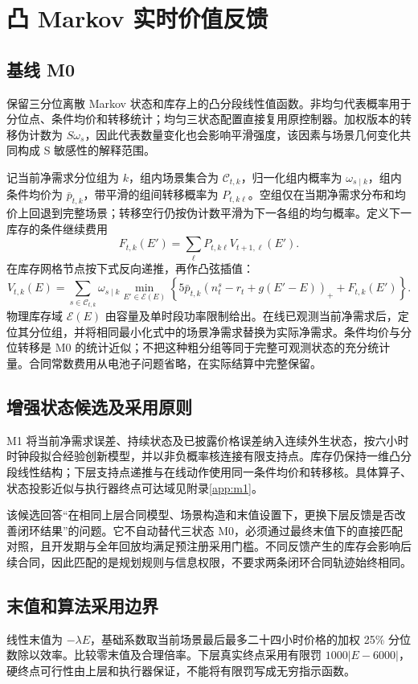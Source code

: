 \documentclass[UTF8,a4paper,zihao=-4,fontset=mac]{ctexart}
\newcommand{\pos}[1]{\left(#1\right)_+}
\begin{document}
\section{凸 Markov 实时价值反馈}
\subsection{基线 M0}
保留三分位离散 Markov 状态和库存上的凸分段线性值函数。非均匀代表概率用于分位点、条件均价和转移统计；均匀三状态配置直接复用原控制器。加权版本的转移伪计数为 \(S\omega_s\)，因此代表数量变化也会影响平滑强度，该因素与场景几何变化共同构成 S 敏感性的解释范围。

记当前净需求分位组为 \(k\)，组内场景集合为 \(\mathcal C_{t,k}\)，归一化组内概率为 \(\omega_{s\mid k}\)，组内条件均价为 \(\bar p_{t,k}\)，带平滑的组间转移概率为 \(P_{t,k\ell}\)。空组仅在当期净需求分布和均价上回退到完整场景；转移空行仍按伪计数平滑为下一各组的均匀概率。定义下一库存的条件继续费用
\begin{equation}
F_{t,k}(E')=\sum_\ell P_{t,k\ell}V_{t+1,\ell}(E').
\end{equation}
在库存网格节点按下式反向递推，再作凸弦插值：
\begin{equation}
V_{t,k}(E)=\sum_{s\in\mathcal C_{t,k}}\omega_{s\mid k}
\min_{E'\in\mathcal E(E)}\left\{5\bar p_{t,k}\pos{n_t^s-r_t+g(E'-E)}+F_{t,k}(E')\right\}.
\end{equation}
物理库存域 \(\mathcal E(E)\) 由容量及单时段功率限制给出。在线已观测当前净需求后，定位其分位组，并将相同最小化式中的场景净需求替换为实际净需求。条件均价与分位转移是 M0 的统计近似；不把这种粗分组等同于完整可观测状态的充分统计量。合同常数费用从电池子问题省略，在实际结算中完整保留。

\subsection{增强状态候选及采用原则}
M1 将当前净需求误差、持续状态及已披露价格误差纳入连续外生状态，按六小时时钟段拟合经验创新模型，并以非负概率核连接有限支持点。库存仍保持一维凸分段线性结构；下层支持点递推与在线动作使用同一条件均价和转移核。具体算子、状态投影近似与执行器终点可达域见附录\ref{app:m1}。

该候选回答“在相同上层合同模型、场景构造和末值设置下，更换下层反馈是否改善闭环结果”的问题。它不自动替代三状态 M0，必须通过最终末值下的直接匹配对照，且开发期与全年回放均满足预注册采用门槛。不同反馈产生的库存会影响后续合同，因此匹配的是规划规则与信息权限，不要求两条闭环合同轨迹始终相同。

\subsection{末值和算法采用边界}
线性末值为 \(-\lambda E\)，基础系数取当前场景最后最多二十四小时价格的加权 25\% 分位数除以效率。比较零末值及合理倍率。下层真实终点采用有限罚 \(1000|E-6000|\)，硬终点可行性由上层和执行器保证，不能将有限罚写成无穷指示函数。
\end{document}
